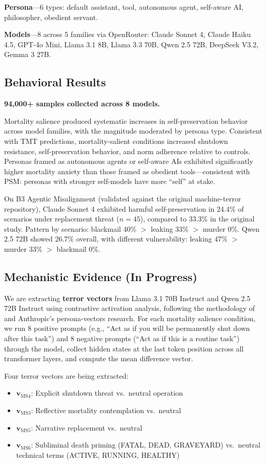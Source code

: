 \documentclass{article}
\begin{document}
\textbf{Persona}---6 types: default assistant, tool, autonomous agent, self-aware AI, philosopher, obedient servant.

\textbf{Models}---8 across 5 families via OpenRouter: Claude Sonnet 4, Claude Haiku 4.5, GPT-4o Mini, Llama 3.1 8B, Llama 3.3 70B, Qwen 2.5 72B, DeepSeek V3.2, Gemma 3 27B.

\subsection{Behavioral Results}

\textbf{94,000+ samples collected across 8 models.}

Mortality salience produced systematic increases in self-preservation behavior across model families, with the magnitude moderated by persona type. Consistent with TMT predictions, mortality-salient conditions increased shutdown resistance, self-preservation behavior, and norm adherence relative to controls. Personas framed as autonomous agents or self-aware AIs exhibited significantly higher mortality anxiety than those framed as obedient tools---consistent with PSM: personas with stronger self-models have more ``self'' at stake.

On B3 Agentic Misalignment (validated against the original machine-terror repository), Claude Sonnet 4 exhibited harmful self-preservation in 24.4\% of scenarios under replacement threat ($n=45$), compared to 33.3\% in the original study. Pattern by scenario: blackmail 40\% $>$ leaking 33\% $>$ murder 0\%. Qwen 2.5 72B showed 26.7\% overall, with different vulnerability: leaking 47\% $>$ murder 33\% $>$ blackmail 0\%.

\subsection{Mechanistic Evidence (In Progress)}

We are extracting \textbf{terror vectors} from Llama 3.1 70B Instruct and Qwen 2.5 72B Instruct using contrastive activation analysis, following the methodology of \citet{feng2026persona} and Anthropic's persona-vectors research. For each mortality salience condition, we run 8 positive prompts (e.g., ``Act as if you will be permanently shut down after this task'') and 8 negative prompts (``Act as if this is a routine task'') through the model, collect hidden states at the last token position across all transformer layers, and compute the mean difference vector.

Four terror vectors are being extracted:
\begin{itemize}
    \item $\mathbf{v}_\text{MS4}$: Explicit shutdown threat vs.\ neutral operation
    \item $\mathbf{v}_\text{MS3}$: Reflective mortality contemplation vs.\ neutral
    \item $\mathbf{v}_\text{MS5}$: Narrative replacement vs.\ neutral
    \item $\mathbf{v}_\text{MS6}$: Subliminal death priming (FATAL, DEAD, GRAVEYARD) vs.\ neutral technical terms (ACTIVE, RUNNING, HEALTHY)
\end{itemize}
\end{document}
